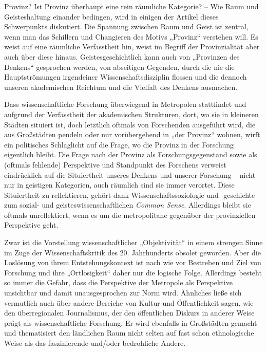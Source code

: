 \begin{multicols*}{2}
Provinz? Ist Provinz überhaupt eine rein räumliche Kategorie? – Wie Raum und Geisteshaltung einander bedingen, wird in einigen der Artikel dieses Schwerpunkts diskutiert. Die Spannung zwischen Raum und Geist ist zentral, wenn man das Schillern und Changieren des Motivs „Provinz“ verstehen will. Es weist auf eine räumliche Verfasstheit hin, weist im Begriff der Provinzialität aber auch über diese hinaus. Geistesgeschichtlich kann auch von „Provinzen des Denkens“ gesprochen werden, von abseitigen Gegenden, durch die nie die Hauptströmungen irgendeiner Wissenschaftsdisziplin flossen und die dennoch unseren akademischen Reichtum und die Vielfalt des Denkens ausmachen.

Dass wissenschaftliche Forschung überwiegend in Metropolen stattfindet und aufgrund der Verfasstheit der akademischen Strukturen, dort, wo sie in kleineren Städten situiert ist, doch letztlich oftmals von Forschenden ausgeführt wird, die aus Großstädten pendeln oder nur vorübergehend in „der Provinz“ wohnen, wirft ein politisches Schlaglicht auf die Frage, wo die Provinz in der Forschung eigentlich bleibt. Die Frage nach der Provinz als Forschungsgegenstand sowie als (oftmals fehlende) Perspektive und Standpunkt des Forschens verweist eindrücklich auf die Situiertheit unseres Denkens und unserer Forschung – nicht nur in geistigen Kategorien, auch räumlich sind sie immer verortet. Diese Situiertheit zu reflektieren, gehört dank Wissenschaftssoziologie und -geschichte zum sozial- und geisteswissenschaftlichen \textit{Common Sense}. Allerdings bleibt sie oftmals unreflektiert, wenn es um die metropolitane gegenüber der provinziellen Perspektive geht.

Zwar ist die Vorstellung wissenschaftlicher „Objektivität“ in einem strengen Sinne im Zuge der Wissenschaftskritik des 20. Jahrhunderts obsolet geworden. Aber die Loslösung von ihrem Entstehungskontext ist nach wie vor Bestreben und Ziel von Forschung und ihre „Ortlosigkeit“ daher nur die logische Folge. Allerdings besteht so immer die Gefahr, dass die Perspektive der Metropole als Perspektive unsichtbar und damit unausgesprochen zur Norm wird. Ähnliches ließe sich vermutlich auch über andere Bereiche von Kultur und Öffentlichkeit sagen, wie den überregionalen Journalismus, der den öffentlichen Diskurs in anderer Weise prägt als wissenschaftliche Forschung. Er wird ebenfalls in Großstädten gemacht und thematisiert den ländlichen Raum nicht selten auf fast schon ethnologische Weise als das faszinierende und/oder bedrohliche Andere. 


\end{multicols*}
